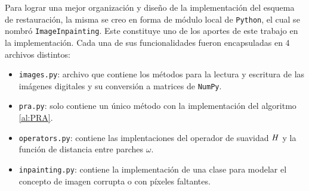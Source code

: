 Para lograr una mejor organizaci\'on y diseño de la implementaci\'on del esquema de restauraci\'on, la misma se creo en forma de m\'odulo local de \texttt{Python}, el cual se nombr\'o \texttt{ImageInpainting}. Este constituye uno de los aportes de este trabajo en la implementación. Cada una de sus funcionalidades fueron encapsuladas en 4 archivos distintos:
\begin{itemize}
	\item \texttt{images.py}: archivo que contiene los m\'etodos para la lectura y escritura de las im\'agenes digitales y su conversi\'on a matrices de \texttt{NumPy}.
	\item \texttt{pra.py}: solo contiene un \'unico m\'etodo con la implementaci\'on del algoritmo \ref{al:PRA}.
	\item \texttt{operators.py}: contiene las implentaciones del operador de suavidad $\mathit{H}$ y la funci\'on de distancia entre parches $\omega$.
	\item \texttt{inpainting.py}: contiene la implementaci\'on de una clase para modelar el concepto de imagen corrupta o con p\'ixeles faltantes.
\end{itemize}

